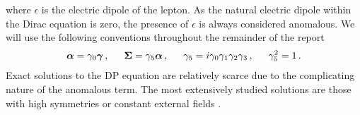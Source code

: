 where $\epsilon$ is the electric dipole of the lepton. As the natural electric dipole within the Dirac equation is zero, the presence of $\epsilon$ is always considered anomalous. We will use the following conventions throughout the remainder of the report
\begin{alignat}{1}
	\label{eq:diracpauli:05} \bb{\alpha}=\gamma_{0}\bb{\gamma}\,,\indent \bb{\Sigma}=\gamma_{5}\bb{\alpha}\,,\indent \gamma_{5}=i\gamma_{0}\gamma_{1}\gamma_{2}\gamma_{3}\,,\indent \gamma^{2}_{5}=1\,.
\end{alignat}
Exact solutions to the DP equation are relatively scarce due to the complicating nature of the anomalous term. The most extensively studied solutions are those with high symmetries or constant external fields \cite{Thaller:2013,Bagrov:2014}.

